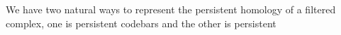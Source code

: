 %
%



%


We have two natural ways to represent the persistent homology of a 
filtered complex, one is persistent codebars and the other is persistent 

